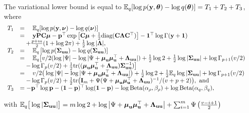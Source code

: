\documentclass{amsart}[12pt]
\begin{document}
The variational lower bound is equal to ${\mathbb E}_q[\log{p({\bf y}, {\boldsymbol\theta})} - \log{q({\boldsymbol\theta})}] = T_1 + T_2 + T_3$,
where
$$
\begin{array}{rl}
	T_1 & = \quad \mathbb{E}_q[\log{p({\bf y}, {\boldsymbol\nu})} - \log{q({\boldsymbol\nu})}]                                                                                                                                                  \\
	    & = \quad {\bf y} {\bf P} {\bf C} {\boldsymbol\mu} - {\bf p}^\top \exp{\left[ {\bf C}{\boldsymbol\mu}+ \frac{1}{2} \text{diag} ({\bf C}{\boldsymbol\Lambda}{\bf C}^\top) \right]} - {\bf 1}^\top\log \Gamma{({\bf y}+ {\bf1})}                                               \\
	    & \quad + \frac{p + m}{2} (1 + \log{2 \pi}) + \frac{1}{2} \log{|{\boldsymbol\Lambda}|},                                                                                                                                \\
	T_2 & = \quad \mathbb{E}_q \left[ \log p({\boldsymbol \Sigma}_{{\bf u} {\bf u}}) - \log q({\boldsymbol \Sigma}_{{\bf u} {\bf u}}) \right]                                                                                                                 \\
	    & = \quad \mathbb{E}_q \big[ v/2(\log |\Psi| - \log |\Psi + {\boldsymbol \mu}_{\bf u} {\boldsymbol \mu}_{\bf u}^\top + {\boldsymbol \Lambda}_{{\bf u} {\bf u}}|) + \frac{1}{2} \log 2 + \frac{1}{2} \log|{\boldsymbol \Sigma}_{{\bf u} {\bf u}}| + \log \Gamma_{p+1}(v/2) \\
	    & \quad - \log \Gamma_{p}(v/2) + \frac{1}{2} \text{tr}(({\boldsymbol \mu}_{{\bf u}} {\boldsymbol \mu}_{{\bf u}}^\top + {\boldsymbol \Lambda}_{{\bf u} {\bf u}}) {\boldsymbol \Sigma}_{{\bf u} {\bf u}}^{-1}) \big]                                                                                                  \\
	    & = \quad v/2\big(\log |\Psi| - \log |\Psi + {\boldsymbol \mu}_{\bf u} {\boldsymbol \mu}_{\bf u}^\top + {\boldsymbol \Lambda}_{{\bf u} {\bf u}}|\big) + \frac{1}{2} \log 2 + \frac{1}{2} \mathbb{E}_q \log |{\boldsymbol \Sigma}_{{\bf u} {\bf u}}| + \log \Gamma_{p+1}(v/2) \\
	    & \quad - \log \Gamma_{p}(v/2) + \frac{1}{2} \text{tr}\big({\bf I}_m + \Psi(\Psi+ {\boldsymbol \mu}_{\bf u} {\boldsymbol \mu}_{\bf u}^\top + {\boldsymbol \Lambda}_{{\bf u} {\bf u}})^{-1}/(v + p + 2)\big), \text{ and }                                                                                       \\
	T_3 & = - {\bf p}^\top \log {\bf p} - ({\bf 1} - {\bf p})^\top \log ({\bf 1} - {\bf p}) - \log \text{Beta} (\alpha_\rho, \beta_\rho) + \log \text{Beta} (\alpha_q, \beta_q),
\end{array}
$$
	
\noindent with $\mathbb{E}_q \big[ \log |{\boldsymbol \Sigma}_{{\bf u} {\bf u}}| \big] = m \log 2 + \log \left | \Psi + {\boldsymbol \mu}_{\bf u} {\boldsymbol \mu}_{\bf u}^\top + {\boldsymbol \Lambda}_{{\bf u} {\bf u}} \right | + \sum_{i=1}^m \Psi \left ( \frac{v - i + 1}{2} \right )$
\end{document}
